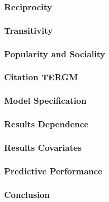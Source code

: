 \documentclass[handout]{beamer}
\begin{document}
\begin{frame} \frametitle{Reciprocity}

\end{frame}

\begin{frame} \frametitle{Transitivity}

\end{frame}

\begin{frame} \frametitle{Popularity and Sociality}

\end{frame}

\begin{frame} \frametitle{Citation TERGM}

\end{frame}

\begin{frame} \frametitle{Model Specification}

\end{frame}

\begin{frame} \frametitle{Results Dependence}

\end{frame}

\begin{frame} \frametitle{Results Covariates}

\end{frame}

\begin{frame} \frametitle{Predictive Performance}

\end{frame}

\begin{frame} \frametitle{Conclusion}

\end{frame}
\end{document}
